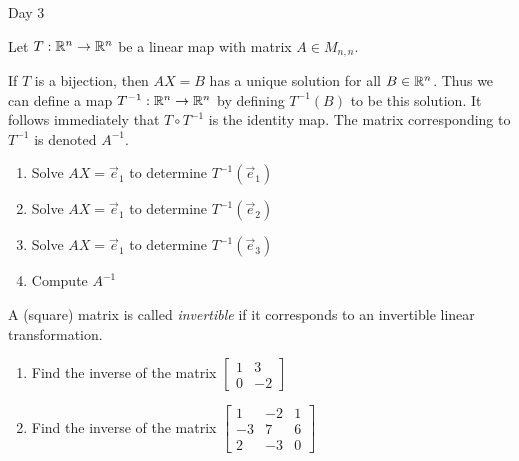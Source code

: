 
\begin{applicationActivities}{Day 3}

\begin{activity}{0}
  Let $T: \mathbb{R}^n \rightarrow \mathbb{R}^n$ be a linear map with matrix $A \in M_{n,n}$.

  If $T$ is a bijection, then $AX=B$ has a unique solution for all $B \in \mathbb{R}^n$.  Thus we can define a map $T^{-1} : \mathbb{R}^n \rightarrow \mathbb{R}^n$ by defining $T^{-1}(B)$ to be this solution.  It follows immediately that $T \circ T^{-1}$ is the identity map.  The matrix corresponding to $T^{-1}$ is denoted $A^{-1}$.

  \begin{enumerate}[1)]
  \item Solve $AX=\vec{e}_1$ to determine $T^{-1}(\vec{e}_1)$
  \item Solve $AX=\vec{e}_1$ to determine $T^{-1}(\vec{e}_2)$
  \item Solve $AX=\vec{e}_1$ to determine $T^{-1}(\vec{e}_3)$
  \item Compute $A^{-1}$
  \end{enumerate}

  A (square) matrix is called {\em invertible} if it corresponds to an invertible linear transformation.

  \begin{enumerate}[1)]
  \item Find the inverse of the matrix $\begin{bmatrix} 1 & 3 \\ 0 & -2 \end{bmatrix}$
  \item Find the inverse of the matrix $\begin{bmatrix} 1 & -2 & 1 \\ -3 & 7 & 6 \\ 2 & -3 & 0 \end{bmatrix}$
  \end{enumerate}
\end{activity}

\end{applicationActivities}
